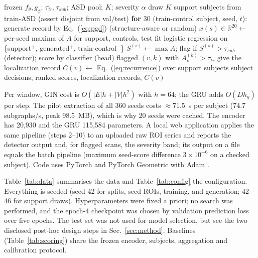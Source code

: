 \documentclass[conference]{IEEEtran}
\makeatletter
\renewcommand\section{\@startsection{section}{1}{\z@}{1.5ex plus 1.5ex minus 0.5ex}{0.7ex}{\normalfont\centering\bfseries}}
\makeatother
\begin{document}
\begin{algorithm}[t]
\caption{Generation, few-shot adaptation and inference}
\label{alg:infer}
\footnotesize
\begin{algorithmic}[1]
\Require frozen $f_\theta,g_\phi$; $\tau_{tr},\tau_{sub}$; ASD pool; $K$; severity $\alpha$
\State draw $K$ support subjects from train-ASD (assert disjoint from val/test)
\State \textbf{for} 30 (train-control subject, seed, $t$): generate record by Eq.~(\ref{eq:pgd}) (structure-aware or random)
\State $x(s)\in\mathbb{R}^{20}\leftarrow$ per-seed maxima of $A$ for support, controls, test
\State fit logistic regression on \{support$^+$, generated$^+$, train-control$^-$\}
 \State $S^{(s)}\leftarrow\max A$; flag if $S^{(s)}>\tau_{sub}$ (detector); score by classifier (head)
 \State flagged $(v,k)$ with $A^{(k)}_v>\tau_{tr}$ give the localization record
\EndFor
\State $C(v)\leftarrow$ Eq.~(\ref{eq:recurrence}) over support subjects
\Ensure subject decisions, ranked scores, localization records, $C(v)$
\end{algorithmic}
\end{algorithm}

Per window, GIN cost is $O(|E|h+|V|h^2)$ with $h{=}64$; the GRU adds $O(Dh_g)$ per step. The pilot extraction of all 360 seeds costs $\approx$71.5~s per subject (74.7 subgraphs/s, peak 98.5~MB), which is why 20 seeds were cached. The encoder has 20,930 and the GRU 115,584 parameters. A local web application applies the same pipeline (steps 2--10) to an uploaded raw ROI series and reports the detector output and, for flagged scans, the severity band; its output on a file equals the batch pipeline (maximum seed-score difference $3{\times}10^{-6}$ on a checked subject). Code uses PyTorch \cite{paszke2019} and PyTorch Geometric \cite{fey2019} with Adam \cite{kingma2015}.

\section{EXPERIMENTAL SETUP}
\label{sec:setup}
Table~\ref{tab:data} summarises the data and Table~\ref{tab:config} the configuration. Everything is seeded (seed 42 for splits, seed ROIs, training, and generation; 42--46 for support draws). Hyperparameters were fixed a priori; no search was performed, and the epoch-4 checkpoint was chosen by validation prediction loss over five epochs. The test set was not used for model selection, but see the two disclosed post-hoc design steps in Sec.~\ref{sec:method}. Baselines (Table~\ref{tab:scoring}) share the frozen encoder, subjects, aggregation and calibration protocol.
\end{document}
